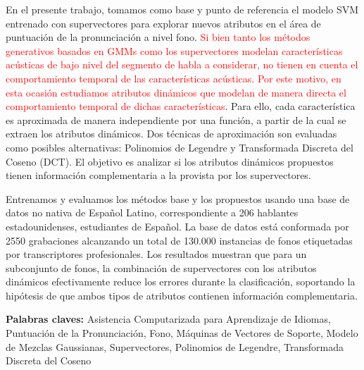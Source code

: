 En el presente trabajo, tomamos como
base y punto de referencia el modelo SVM entrenado con
supervectores para explorar nuevos atributos en el área de puntuación de la
pronunciación a nivel fono.
\textcolor{red}{
Si bien tanto los métodos generativos basados en GMMs como
los supervectores modelan características acústicas de bajo nivel del segmento
de habla a considerar,
no tienen en cuenta el comportamiento temporal de las características acústicas.
Por este motivo, en esta ocasión
estudiamos atributos dinámicos
que modelan de manera directa el comportamiento temporal de dichas
características}.
Para ello, cada característica es aproximada
de manera independiente por una función,
a partir de la cual se extraen los atributos dinámicos.
Dos técnicas de aproximación son evaluadas como posibles alternativas:
Polinomios de Legendre y Transformada Discreta del Coseno (DCT).
El objetivo
es analizar si
los atributos dinámicos propuestos tienen información
complementaria a la provista por los supervectores.

Entrenamos y evaluamos los métodos base y los propuestos usando una base de datos no nativa
de Español Latino, correspondiente a 206 hablantes estadounidenses, estudiantes de Español.
La base de datos está conformada por 2550 grabaciones alcanzando
un total de 130.000 instancias de fonos etiquetadas
por transcriptores profesionales.
Los resultados muestran que para un subconjunto de fonos, la combinación de supervectores
con los atributos dinámicos efectivamente reduce los errores durante la clasificación,
soportando la
hipótesis de que ambos tipos de atributos contienen información complementaria.

\bigskip

\noindent\textbf{Palabras claves:} Asistencia Computarizada para Aprendizaje de Idiomas, Puntuación de la Pronunciación, Fono, Máquinas de Vectores de Soporte, Modelo de Mezclas Gaussianas, Supervectores, Polinomios de Legendre, Transformada Discreta del Coseno


